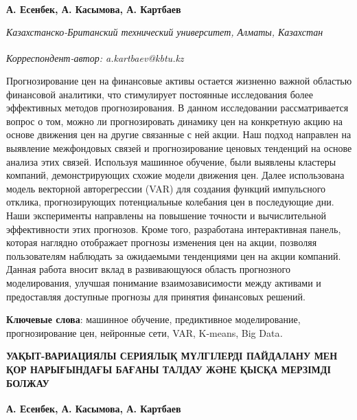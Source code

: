 
\begin{articleheader}

{\bfseries А. Есенбек\authorid,
А. Касымова\authorid,
А. Картбаев\textsuperscript{\envelope } \authorid}
\end{articleheader}

\begin{affiliation}
\emph{Казахстанско-Британский технический университет, Алматы, Казахстан}

\raggedright {\bfseries \textsuperscript{\envelope }}{\em Корреспондент-автор: a.kartbaev@kbtu.kz}
\end{affiliation}

Прогнозирование цен на финансовые активы остается жизненно важной
областью финансовой аналитики, что стимулирует постоянные исследования
более эффективных методов прогнозирования. В данном исследовании
рассматривается вопрос о том, можно ли прогнозировать динамику цен на
конкретную акцию на основе движения цен на другие связанные с ней акции.
Наш подход направлен на выявление межфондовых связей и прогнозирование
ценовых тенденций на основе анализа этих связей. Используя машинное
обучение, были выявлены кластеры компаний, демонстрирующих схожие модели
движения цен. Далее использована модель векторной авторегрессии (VAR)
для создания функций импульсного отклика, прогнозирующих потенциальные
колебания цен в последующие дни. Наши эксперименты направлены на
повышение точности и вычислительной эффективности этих прогнозов. Кроме
того, разработана интерактивная панель, которая наглядно отображает
прогнозы изменения цен на акции, позволяя пользователям наблюдать за
ожидаемыми тенденциями цен на акции компаний. Данная работа вносит вклад
в развивающуюся область прогнозного моделирования, улучшая понимание
взаимозависимости между активами и предоставляя доступные прогнозы для
принятия финансовых решений.

{\bfseries Ключевые слова}: машинное обучение, предиктивное моделирование,
прогнозирование цен, нейронные сети, VAR, K-means, Big Data\emph{.}

\begin{articleheader}
{\bfseries УАҚЫТ-ВАРИАЦИЯЛЫ СЕРИЯЛЫҚ МҮЛГІЛЕРДІ ПАЙДАЛАНУ МЕН ҚОР НАРЫҒЫНДАҒЫ БАҒАНЫ ТАЛДАУ ЖӘНЕ ҚЫСҚА МЕРЗІМДІ БОЛЖАУ}

{\bfseries
А. Есенбек,
А. Касымова,
А. Картбаев\textsuperscript{\envelope }}
\end{articleheader}

